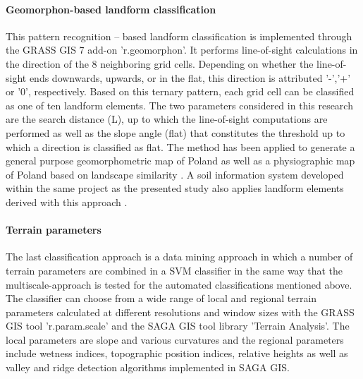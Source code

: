 \documentclass[preprint,12pt,authoryear]{elsarticle}
\begin{document}
\paragraph{Geomorphon-based landform classification \citep{Jasiewicz2013}}
This pattern recognition – based landform classification is implemented through the GRASS GIS 7 add-on 'r.geomorphon'. It performs line-of-sight calculations in the direction of the 8 neighboring grid cells.  Depending on whether the line-of-sight ends downwards,  upwards, or in the flat, this direction is attributed '-','+' or '0', respectively.  Based on this ternary pattern, each grid cell can be classified as one of ten landform elements. The two parameters considered in this research are the search distance (L), up to which the line-of-sight computations are performed as well as the slope angle (flat) that constitutes the threshold up to which a direction is classified as flat. The method has been applied to generate a general purpose geomorphometric map of Poland \citep{Jasiewicz2013} as well as a physiographic map of Poland based on landscape similarity \citep{Jasiewicz2014}. A soil information system developed within the same project as the presented study also applies landform elements derived with this approach \citep{Geitner2017}.
\paragraph{Terrain parameters}
The last classification approach is a data mining approach in which a number of terrain parameters are combined in a SVM classifier in the same way that the multiscale-approach is tested for the automated classifications mentioned above. The classifier can choose from a wide range of local and regional terrain parameters calculated at different resolutions and window sizes with the GRASS GIS tool 'r.param.scale' and the SAGA GIS tool library 'Terrain Analysis'. The local parameters are slope and various curvatures and the regional parameters include wetness indices, topographic position indices, relative heights as well as valley and ridge detection algorithms implemented in SAGA GIS.  
\end{document}
